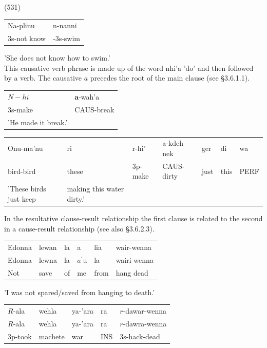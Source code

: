 \documentclass[10pt]{article}
\begin{document}
(531)

\begin{center}
\begin{tabular}{ll}
Na-plinu & n-nanni \\
3s-not know & -3s-swim \\
\end{tabular}
\end{center}

'She does not know how to swim.'\\
This causative verb phrase is made up of the word nhi'a 'do' and then followed by a verb. The causative \(a\) precedes the root of the main clause (see §3.6.1.1).

\begin{center}
\begin{tabular}{ll}
\(N-h i\) & \(\boldsymbol{a}\)-wah'a \\
3s-make & CAUS-break \\
'He made it break.' &  \\
\end{tabular}
\end{center}

\begin{center}
\begin{tabular}{lllllll}
Onu-ma'nu & ri & r-hi' & a-kdeh nek & ger & di & wa \\
bird-bird & these & 3p-make & CAUS-dirty & just & this & PERF \\
'These birds just keep & making this water dirty.' &  &  &  &  &  \\
\end{tabular}
\end{center}

In the resultative clause-result relationship the first clause is related to the second in a cause-result relationship (see also §3.6.2.3).

\begin{center}
\begin{tabular}{llllll}
Edonna & lewan & la & a & lia & wair-wenna \\
Edonna & lewna & la & \(a^{\prime} \mathrm{u}\) & la & wairi-wenna \\
Not & save & of & me & from & hang dead \\
\end{tabular}
\end{center}

'I was not spared/saved from hanging to death.'

\begin{center}
\begin{tabular}{lllll}
\(R\)-ala & wehla & ya-'ara & ra & \(r\)-dawar-wenna \\
\(R\)-ala & wehla & ya-'ara & ra & \(r\)-dawra-wenna \\
3p-took & machete & war & INS & 3s-hack-dead \\
\end{tabular}
\end{center}
\end{document}
